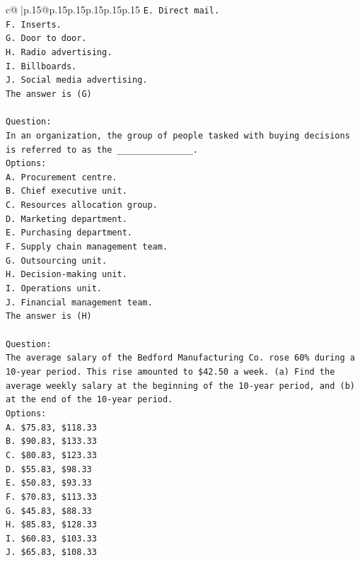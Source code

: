 \documentclass{article}
\begin{document}
{\begin{supertabular}{c@{$\;$}|p{.15\linewidth}@{}p{.15\linewidth}p{.15\linewidth}p{.15\linewidth}p{.15\linewidth}p{.15\linewidth}}
{{{\texttt{E. Direct mail.} \\
\texttt{F. Inserts.} \\
\texttt{G. Door to door.} \\
\texttt{H. Radio advertising.} \\
\texttt{I. Billboards.} \\
\texttt{J. Social media advertising.} \\
\texttt{The answer is (G)} \\
\\ 
\texttt{Question:} \\
\texttt{In an organization, the group of people tasked with buying decisions is referred to as the \_\_\_\_\_\_\_\_\_\_\_\_\_\_\_.} \\
\texttt{Options:} \\
\texttt{A. Procurement centre.} \\
\texttt{B. Chief executive unit.} \\
\texttt{C. Resources allocation group.} \\
\texttt{D. Marketing department.} \\
\texttt{E. Purchasing department.} \\
\texttt{F. Supply chain management team.} \\
\texttt{G. Outsourcing unit.} \\
\texttt{H. Decision{-}making unit.} \\
\texttt{I. Operations unit.} \\
\texttt{J. Financial management team.} \\
\texttt{The answer is (H)} \\
\\ 
\texttt{Question:} \\
\texttt{The average salary of the Bedford Manufacturing Co. rose 60\% during a 10{-}year period. This rise amounted to \$42.50 a week. (a) Find the average weekly salary at the beginning of the 10{-}year period, and (b) at the end of the 10{-}year period.} \\
\texttt{Options:} \\
\texttt{A. \$75.83, \$118.33} \\
\texttt{B. \$90.83, \$133.33} \\
\texttt{C. \$80.83, \$123.33} \\
\texttt{D. \$55.83, \$98.33} \\
\texttt{E. \$50.83, \$93.33} \\
\texttt{F. \$70.83, \$113.33} \\
\texttt{G. \$45.83, \$88.33} \\
\texttt{H. \$85.83, \$128.33} \\
\texttt{I. \$60.83, \$103.33} \\
\texttt{J. \$65.83, \$108.33} \\
            }
        }
    }
     \\ \\


\end{supertabular}}
\end{document}
